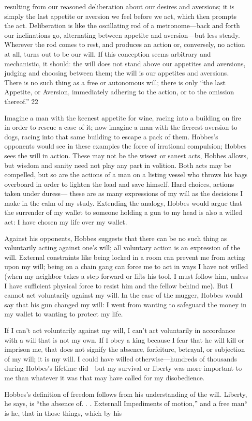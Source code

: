 resulting from our reasoned deliberation about our desires and aversions; it is simply the last appetite or aversion we feel before we act, which then prompts the act. Deliberation is like the oscillating rod of a metronome—back and forth our inclinations go, alternating between appetite and aversion—but less steady. Wherever the rod comes to rest, and produces an action or, conversely, no action at all, turns out to be our will. If this conception seems arbitrary and mechanistic, it should: the will does not stand above our appetites and aversions, judging and choosing between them; the will is our appetites and aversions. There is no such thing as a free or autonomous will; there is only “the last Appetite, or Aversion, immediately adhering to the action, or to the omission thereof.” {\color{blue} 22 } {\par} Imagine a man with the keenest appetite for wine, racing into a building on fire in order to rescue a case of it; now imagine a man with the fiercest aversion to dogs, racing into that same building to escape a pack of them. Hobbes’s opponents would see in these examples the force of irrational compulsion; Hobbes sees the will in action. These may not be the wisest or sanest acts, Hobbes allows, but wisdom and sanity need not play any part in volition. Both acts may be compelled, but so are the actions of a man on a listing vessel who throws his bags overboard in order to lighten the load and save himself. Hard choices, actions taken under duress— these are as many expressions of my will as the decisions I make in the calm of my study. Extending the analogy, Hobbes would argue that the surrender of my wallet to someone holding a gun to my head is also a willed act: I have chosen my life over my wallet.{\par} Against his opponents, Hobbes suggests that there can be no such thing as voluntarily acting against one’s will; all voluntary action is an expression of the will. External constraints like being locked in a room can prevent me from acting upon my will; being on a chain gang can force me to act in ways I have not willed (when my neighbor takes a step forward or lifts his tool, I must follow him, unless I have sufficient physical force to resist him and the fellow behind me). But I cannot act voluntarily against my will. In the case of the mugger, Hobbes would say that his gun changed my will: I went from wanting to safeguard the money in my wallet to wanting to protect my life.{\par} If I can’t act voluntarily against my will, I can’t act voluntarily in accordance with a will that is not my own. If I obey a king because I fear that he will kill or imprison me, that does not signify the absence, forfeiture, betrayal, or subjection of my will; it is my will. I could have willed otherwise—hundreds of thousands during Hobbes’s lifetime did—but my survival or liberty was more important to me than whatever it was that may have called for my disobedience.{\par} Hobbes’s definition of freedom follows from his understanding of the will. Liberty, he says, is “the absence of. . . Externall Impediments of motion,” and a free man“ is he, that in those things, which by his 